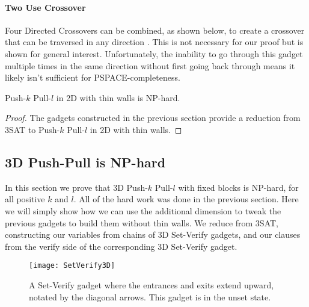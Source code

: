 \paragraph{Two Use Crossover} 
Four Directed Crossovers can be combined, as shown below, to create a crossover that can be traversed in any direction \cite{Push100}. This is not necessary for our proof but is shown for general interest. Unfortunately, the inability to go through this gadget multiple times in the same direction without first going back through means it likely isn't sufficient for PSPACE-completeness. 

\begin{theorem}
\label{thm:2DNPhard}
Push-$k$ Pull-$l$ in 2D with thin walls is NP-hard.
\end{theorem}
\begin{proof}
The gadgets constructed in the previous section provide a reduction from 3SAT to Push-$k$ Pull-$l$ in 2D with thin walls.
\end{proof}

\subsection{3D Push-Pull is NP-hard}
\label{3DNPhard}
In this section we prove that 3D Push-$k$ Pull-$l$ with fixed blocks is NP-hard, for all positive $k$ and $l$. All of the hard work was done in the previous section. Here we will simply show how we can use the additional dimension to tweak the previous gadgets to build them without thin walls. We reduce from 3SAT, constructing our variables from chains of 3D Set-Verify gadgets, and our clauses from the verify side of the corresponding 3D Set-Verify gadget.


\begin{wrapfigure}{r}{0.45\textwidth}
  \centering
    \texttt{[image: SetVerify3D]}
    \caption{A Set-Verify gadget where the entrances and exits extend upward, notated by the diagonal arrows. This gadget is in the unset state.}
    \label{3DSetVerify}
    \vspace{-2mm}
\end{wrapfigure}

